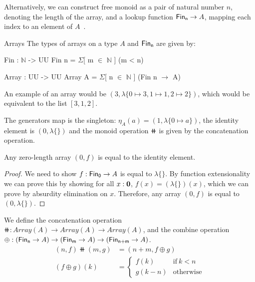 Alternatively, we can construct free monoid as a pair of natural number $n$, denoting the length of the array,
and a lookup function $\Fin[n] \to A$, mapping each index to an element of $A$~\cite{dubucFreeMonoids1974}.

\begin{definition}{Arrays}
The types of arrays on a type $A$ and $\Fin[n]$ are given by:
\begin{code}
Fin : $\mathbb{N}$ -> UU
Fin n = $\Sigma$[ m $\in$ $\mathbb{N}$ ] (m < n)

Array : UU -> UU
Array A = $\Sigma$[ n $\in$ $\mathbb{N}$ ] (Fin n $\to$ A)
\end{code}
\vspace{1em}
\end{definition}

An example of an array would be $(3, \lambda\{ 0 \mapsto 3, 1 \mapsto 1, 2 \mapsto 2 \})$, which would
be equivalent to the list $[3, 1, 2]$.

The generators map is the singleton: $\eta_A(a) = (1, \lambda\{ 0 \mapsto a \})$, 
the identity element is $(0, \lambda\{\})$
and the monoid operation $\doubleplus$ is given by the concatenation operation.

\begin{lemma}\label{array:zero-is-id}
Any zero-length array $(0, f)$ is equal to the identity element.
\end{lemma}

\begin{proof}
We need to show $f : \Fin[0] \to A$ is equal to $\lambda\{\}$. By function extensionality we can prove
this by showing for all $x : {\mathbf{0}}$, $f(x) = (\lambda\{\})(x)$, which we can prove by absurdity elimination on $x$.
Therefore, any array $(0, f)$ is equal to $(0, \lambda\{\})$.
\end{proof}

\begin{definition}[Concatenation]
We define the concatenation operation $\doubleplus : Array(A) \to Array(A) \to Array(A)$,
and the combine operation $\oplus : (\Fin[n] \to A) \to (\Fin[m] \to A) \to (\Fin[n+m] \to\nolinebreak A)$.
\begin{align*}
    (n , f) \doubleplus (m , g) & = (n + m , f \oplus g) \\
    (f \oplus g)(k) & = \begin{cases}
      f(k) & \text{if}\ k < n \\
      g(k - n) & \text{otherwise}
    \end{cases}
\end{align*} 
\end{definition}

